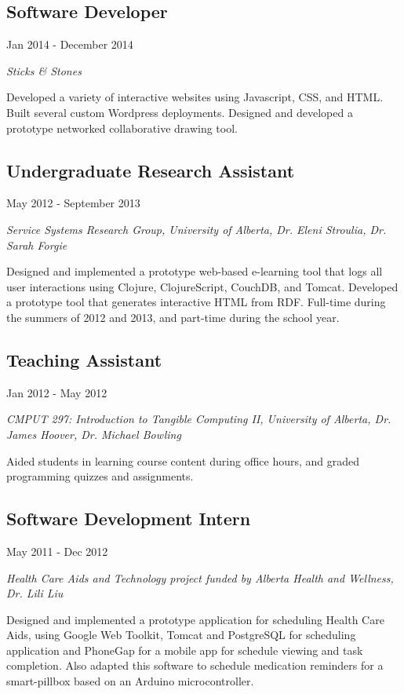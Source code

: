 \documentclass[10pt]{article}
\begin{document}
\subsection*{Software Developer}
Jan 2014 - December 2014

\emph{Sticks \& Stones}
\vspace{\baselineskip}

Developed a variety of interactive websites using Javascript, CSS, and HTML. Built several custom Wordpress deployments. Designed and developed a prototype networked collaborative drawing tool.

\subsection*{Undergraduate Research Assistant}
May 2012 - September 2013

\emph{Service Systems Research Group, University of Alberta, Dr. Eleni Stroulia, Dr. Sarah Forgie}
\vspace{\baselineskip}

Designed and implemented a prototype web-based e-learning tool that logs all user interactions using Clojure, ClojureScript, CouchDB, and Tomcat. Developed a prototype tool that generates interactive HTML from RDF. Full-time during the summers of 2012 and 2013, and part-time during the school year.

\subsection*{Teaching Assistant}
Jan 2012 - May 2012

\emph{CMPUT 297: Introduction to Tangible Computing II, University of Alberta, Dr. James Hoover, Dr. Michael Bowling}
\vspace{\baselineskip}

Aided students in learning course content during office hours, and graded programming quizzes and assignments.

\subsection*{Software Development Intern}
May 2011 - Dec 2012

\emph{Health Care Aids and Technology project funded by Alberta Health and Wellness, Dr. Lili Liu}
\vspace{\baselineskip}

Designed and implemented a prototype application for scheduling Health Care Aids, using Google Web Toolkit, Tomcat and PostgreSQL for scheduling application and PhoneGap for a mobile app for schedule viewing and task completion. Also adapted this software to schedule medication reminders for a smart-pillbox based on an Arduino microcontroller.
\end{document}
